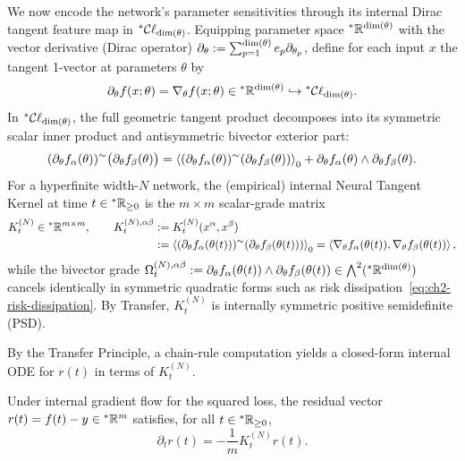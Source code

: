 We now encode the network's parameter sensitivities through its internal Dirac tangent feature map in ${}^*\mathcal{C}\ell_{\dim(\theta)}$. Equipping parameter space ${}^*\mathbb{R}^{\dim(\theta)}$ with the vector derivative (Dirac operator) $\partial_\theta := \sum_{p=1}^{\dim(\theta)} e_p \partial_{\theta_p}$, define for each input $x$ the tangent 1-vector at parameters $\theta$ by
\begin{equation}\label{eq:ch2-tangent-map}
\partial_\theta f(x; \theta) = \nabla_\theta f(x; \theta) \in {}^*\mathbb{R}^{\dim(\theta)} \hookrightarrow {}^*\mathcal{C}\ell_{\dim(\theta)}.
\end{equation}
In ${}^*\mathcal{C}\ell_{\dim(\theta)}$, the full geometric tangent product decomposes into its symmetric scalar inner product and antisymmetric bivector exterior part:
\[
(\partial_\theta f_\alpha(\theta))^{\sim}\bigl(\partial_\theta f_\beta(\theta)\bigr) = \left\langle (\partial_\theta f_\alpha(\theta))^{\sim}(\partial_\theta f_\beta(\theta)) \right\rangle_0 + \partial_\theta f_\alpha(\theta) \wedge \partial_\theta f_\beta(\theta).
\]
For a hyperfinite width-$N$ network, the (empirical) internal Neural Tangent Kernel at time $t \in {}^*\mathbb{R}_{\ge 0}$ is the $m \times m$ scalar-grade matrix
\begin{equation}\label{eq:ch2-ntk-def}
\begin{aligned}
K_t^{(N)} \in {}^*\mathbb{R}^{m \times m}, \qquad K_t^{(N),\alpha\beta} &:= K_t^{(N)}(x^\alpha, x^\beta) \\
&:= \left\langle (\partial_\theta f_\alpha(\theta(t)))^{\sim}(\partial_\theta f_\beta(\theta(t))) \right\rangle_0 = \left\langle \nabla_\theta f_\alpha(\theta(t)), \nabla_\theta f_\beta(\theta(t)) \right\rangle,
\end{aligned}
\end{equation}
while the bivector grade $\Omega_t^{(N),\alpha\beta} := \partial_\theta f_\alpha(\theta(t)) \wedge \partial_\theta f_\beta(\theta(t)) \in \bigwedge^2({}^*\mathbb{R}^{\dim(\theta)})$ cancels identically in symmetric quadratic forms such as risk dissipation~\eqref{eq:ch2-risk-dissipation}. By Transfer, $K_t^{(N)}$ is internally symmetric positive semidefinite (PSD).

By the Transfer Principle, a chain-rule computation yields a closed-form internal ODE for $r(t)$ in terms of $K_t^{(N)}$.

\begin{proposition}\label{prop:ch2-residual-ode}
Under internal gradient flow for the squared loss, the residual vector $r(t) = f(t) - y \in {}^*\mathbb{R}^m$ satisfies, for all $t \in {}^*\mathbb{R}_{\ge 0}$,
\begin{equation}\label{eq:ch2-residual-ode}
\partial_t r(t) = -\frac{1}{m} K_t^{(N)} r(t).
\end{equation}
\end{proposition}

